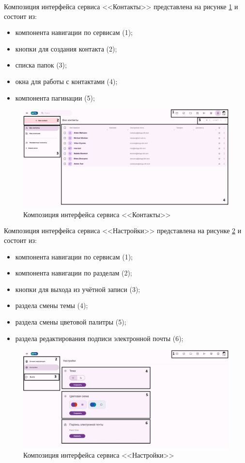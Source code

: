 Композиция интерфейса сервиса <<Контакты>> представлена на рисунке \ref{templ:image5} и состоит из:
\begin{itemize}
  \item компонента навигации по сервисам (1);
  \item кнопки для создания контакта (2);
  \item списка папок (3);
  \item окна для работы с контактами (4);
  \item компонента пагинации (5);
\end{itemize}
\begin{figure}[H]
	\centering
	\includegraphics[width=1\linewidth]{images/контакты}
	\caption{Композиция интерфейса сервиса <<Контакты>>}
	\label{templ:image5}
\end{figure}

Композиция интерфейса сервиса <<Настройки>> представлена на рисунке \ref{templ:image6} и состоит из:
\begin{itemize}
  \item компонента навигации по сервисам (1);
  \item компонента навигации по разделам (2);
  \item кнопки для выхода из учётной записи (3);
  \item раздела смены темы (4);
  \item раздела смены цветовой палитры (5);
  \item раздела редактирования подписи электронной почты (6);
\end{itemize}
\begin{figure}[H]
	\centering
	\includegraphics[width=1\linewidth]{images/настройки}
	\caption{Композиция интерфейса сервиса <<Настройки>>}
	\label{templ:image6}
\end{figure}

